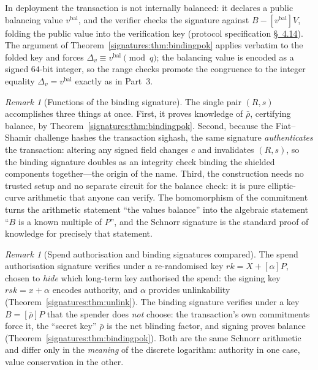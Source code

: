 \documentclass[11pt,a4paper]{article}
\theoremstyle{definition}
\theoremstyle{remark}
\newtheorem{remark}[theorem]{Remark}
\begin{document}
In deployment the transaction is not internally balanced: it
declares a public balancing value \(v^{\mathrm{bal}}\), and the
verifier checks the signature against \(B - [v^{\mathrm{bal}}]V\),
folding the public value into the verification key
(protocol specification \href{https://zips.z.cash/protocol/protocol.pdf\#orchardbalance}{\S~4.14}). The
argument of Theorem~\ref{signatures:thm:bindingpok} applies verbatim
to the folded key and forces
\(\Delta_v \equiv v^{\mathrm{bal}} \pmod q\); the balancing value is
encoded as a signed \(64\)-bit integer, so the range checks promote
the congruence to the integer equality
\(\Delta_v = v^{\mathrm{bal}}\) exactly as in Part~3.

\begin{remark}[Functions of the binding signature]
\label{signatures:rem:why-signature}
The single pair \((R, s)\) accomplishes three things at once.
First, it proves knowledge of \(\bar\rho\), certifying balance, by
Theorem~\ref{signatures:thm:bindingpok}. Second, because the
Fiat--Shamir challenge hashes the transaction sighash, the same
signature \emph{authenticates} the transaction: altering any signed
field changes \(c\) and invalidates \((R, s)\), so the binding
signature doubles as an integrity check binding the shielded
components together---the origin of the name. Third, the
construction needs no trusted setup and no separate circuit for the
balance check: it is pure elliptic-curve arithmetic that anyone can
verify. The homomorphism of the commitment turns the arithmetic
statement ``the values balance'' into the algebraic statement
``\(B\) is a known multiple of \(P\)'', and the Schnorr signature is
the standard proof of knowledge for precisely that statement.
\end{remark}

\begin{remark}[Spend authorisation and binding signatures compared]
\label{signatures:rem:two-uses}
The spend authorisation signature verifies under a re-randomised key
\(rk = X + [\alpha]P\), chosen to \emph{hide} which long-term key
authorised the spend: the signing key \(rsk = x + \alpha\) encodes
authority, and \(\alpha\) provides unlinkability
(Theorem~\ref{signatures:thm:unlink}). The binding signature
verifies under a key \(B = [\bar\rho]P\) that the spender does
\emph{not} choose: the transaction's own commitments force it, the
``secret key'' \(\bar\rho\) is the net blinding factor, and signing
proves balance (Theorem~\ref{signatures:thm:bindingpok}). Both are
the same Schnorr arithmetic and differ only in the \emph{meaning} of
the discrete logarithm: authority in one case, value conservation in
the other.
\end{remark}
\end{document}
